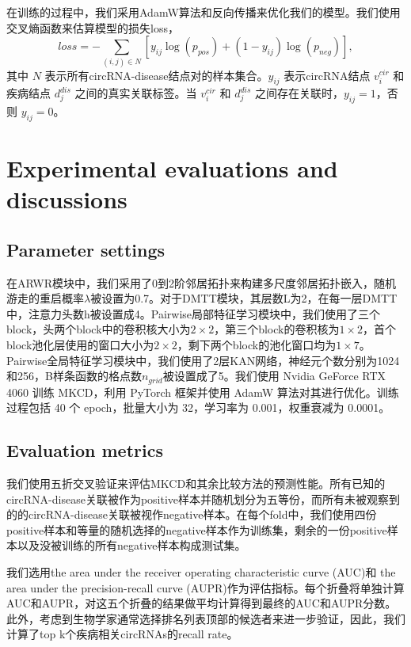 \documentclass{bioinfo}
\begin{document}
\begin{methods}
在训练的过程中，我们采用AdamW算法和反向传播来优化我们的模型。我们使用交叉熵函数来估算模型的损失loss，
\begin{equation}
	loss = - \sum\limits_{(i,j) \in N} \left[ y_{ij} \log (p_{pos}) + (1 - y_{ij}) \log (p_{neg}) \right],
\end{equation}
其中 $N$ 表示所有circRNA-disease结点对的样本集合。$y_{ij}$ 表示circRNA结点 $v_i^{cir}$ 和疾病结点 $d_j^{dis}$ 之间的真实关联标签。当 $v_i^{cir}$ 和 $d_j^{dis}$ 之间存在关联时，$y_{ij} = 1$，否则 $y_{ij} = 0$。


\section{Experimental evaluations and discussions}
\subsection{Parameter settings}
在ARWR模块中，我们采用了0到2阶邻居拓扑来构建多尺度邻居拓扑嵌入，随机游走的重启概率$\lambda$被设置为0.7。对于DMTT模块，其层数L为2，在每一层DMTT中，注意力头数h被设置成4。Pairwise局部特征学习模块中，我们使用了三个block，头两个block中的卷积核大小为$2\times 2$，第三个block的卷积核为$1\times 2$，首个block池化层使用的窗口大小为$2\times 2$，剩下两个block的池化窗口均为$1\times 7$。Pairwise全局特征学习模块中，我们使用了2层KAN网络，神经元个数分别为1024和256，B样条函数的格点数$n_{grid}$被设置成了5。我们使用 Nvidia GeForce RTX 4060 训练 MKCD，利用 PyTorch 框架并使用 AdamW 算法对其进行优化。训练过程包括 40 个 epoch，批量大小为 32，学习率为 0.001，权重衰减为 0.0001。

\subsection{Evaluation metrics}
我们使用五折交叉验证来评估MKCD和其余比较方法的预测性能。所有已知的circRNA-disease关联被作为positive样本并随机划分为五等份，而所有未被观察到的的circRNA-disease关联被视作negative样本。在每个fold中，我们使用四份positive样本和等量的随机选择的negative样本作为训练集，剩余的一份positive样本以及没被训练的所有negative样本构成测试集。

我们选用the area under the receiver operating characteristic curve (AUC)\cite{hajian2013receiver}和 the area under the precision-recall curve (AUPR)\cite{saito2015precision}作为评估指标。每个折叠将单独计算AUC和AUPR，对这五个折叠的结果做平均计算得到最终的AUC和AUPR分数。此外，考虑到生物学家通常选择排名列表顶部的候选者来进一步验证，因此，我们计算了top k个疾病相关circRNAs的recall rate。



\end{methods}
\end{document}
